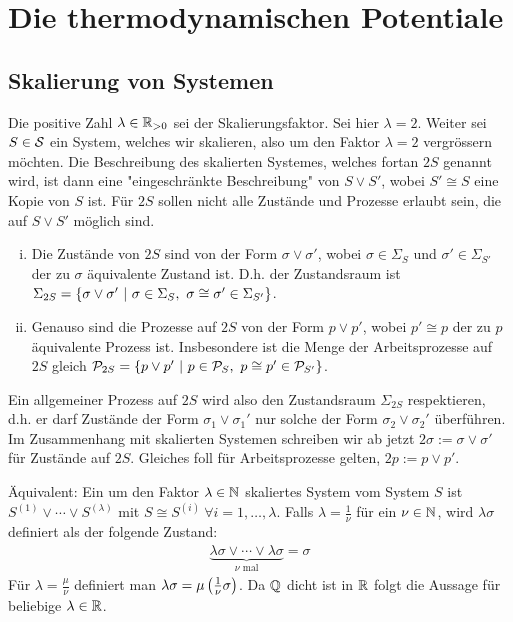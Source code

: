 \section{Die thermodynamischen Potentiale}

\subsection{Skalierung von Systemen}

Die positive Zahl $\lambda \in \R_{>0}$ sei der Skalierungsfaktor. Sei hier
$\lambda = 2$. Weiter sei $S \in \S$ ein System, welches wir skalieren, also
um den Faktor $\lambda = 2$ vergrössern möchten. Die Beschreibung des
skalierten Systemes, welches fortan $2S$ genannt wird, ist dann eine
"eingeschränkte Beschreibung" von $S \vee S'$, wobei $S' \cong S$ eine
Kopie von $S$ ist. Für $2S$ sollen nicht alle Zustände und Prozesse erlaubt
sein, die auf $S \vee S'$ möglich sind.
\begin{enumerate}[(i)]
    \item Die Zustände von $2S$ sind von der Form $\sigma \vee \sigma'$,
        wobei $\sigma \in \Sigma_S$ und $\sigma' \in \Sigma_{S'}$ der zu
        $\sigma$ äquivalente Zustand ist. D.h. der Zustandsraum ist
        $\Sigma_{2S} = \geschwungeneklammer{\sigma \vee \sigma' \ | \
        \sigma \in \Sigma_S , \ \sigma \cong \sigma' \in \Sigma_{S'}}$.
    \item Genauso sind die Prozesse auf $2S$ von der Form $p \vee p'$, wobei
        $p' \cong p$ der zu $p$ äquivalente Prozess ist. Insbesondere ist
        die Menge der Arbeitsprozesse auf $2S$ gleich $\P_{2S} =
        \geschwungeneklammer{p \vee p' \ | \ p \in \P_S , \ p \cong p' \in
        \P_{S'}}$.
\end{enumerate}
Ein allgemeiner Prozess auf $2S$ wird also den Zustandsraum $\Sigma_{2S}$
respektieren, d.h. er darf Zustände der Form $\sigma_1 \vee \sigma_1'$ nur
solche der Form $\sigma_2 \vee \sigma_2'$ überführen. Im Zusammenhang mit
skalierten Systemen schreiben wir ab jetzt $2\sigma := \sigma \vee \sigma'$
für Zustände auf $2S$. Gleiches foll für Arbeitsprozesse gelten,
$2p := p \vee p'$.

Äquivalent: Ein um den Faktor $\lambda \in \N$ skaliertes System vom System
$S$ ist $S^{(1)} \vee \dotsb \vee S^{(\lambda)}$ mit $S \cong S^{(i)} \ \forall
i =1,\dots,\lambda$. Falls $\lambda = \frac{1}{\nu}$ für ein $\nu \in \N$,
wird $\lambda \sigma$ definiert als der folgende Zustand:
\begin{align*}
    \underbrace{\lambda \sigma \vee \dotsb \vee \lambda \sigma}_{\nu \text{ mal}}
    = \sigma
\end{align*}
Für $\lambda = \frac{\mu}{\nu}$ definiert man $\lambda \sigma = \mu
\klammer{\frac{1}{\nu} \sigma}$. Da $\Q$ dicht ist in $\R$ folgt die
Aussage für beliebige $\lambda \in \R$.

